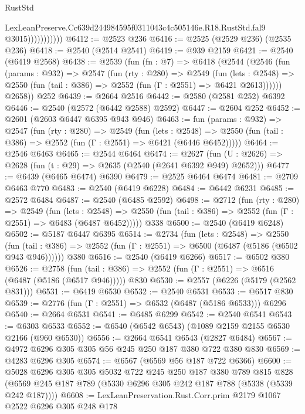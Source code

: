 \begin{lexlean}{RustStd}
\begin{coremodule}
                          LexLeanPreserve.Cc639d244984595f0311043c4c505146e.R18.RustStd.fal9
                          @3015)))))))))))
@6412 := @2523 @236
@6416 := @2525 (@2529 @236) (@2535 @236)
@6418 := @2540 (@2514 @2541)
@6419 := @939 @2159
@6421 := @2540 (@6419 @2568)
@6438 := @2539
    (fun (fn : @7) =>
    @6418
      (@2544
        (@2546
          (fun (params : @932) =>
          @2547
            (fun (rty : @280) =>
            @2549
              (fun (lets : @2548) =>
              @2550 (fun (tail : @386) => @2552 (fun (Γ : @2551) => @6421 @2613))))))
        @2658))
    @252
@6439 := @2664 @2516
@6442 := @2580 (@2581 @252) @6392
@6446 := @2540 (@2572 (@6442 @2588) @2592)
@6447 := @2604 @252
@6452 := @2601 (@2603 @6447 @6395 @943 @946)
@6463 := fun (params : @932) =>
  @2547
    (fun (rty : @280) =>
    @2549
      (fun (lets : @2548) =>
      @2550 (fun (tail : @386) => @2552 (fun (Γ : @2551) => @6421 (@6446 @6452)))))
@6464 := @2546 @6463
@6465 := @2544 @6464
@6474 := @2627 (fun (U : @2626) => @2628 (fun (t : @29) => @2635 (@2540 (@2641 @6392 @949) @2652)))
@6477 := @6439 (@6465 @6474) @6390
@6479 := @2525 @6464 @6474
@6481 := @2709 @6463 @770
@6483 := @2540 (@6419 @6228)
@6484 := @6442 @6231
@6485 := @2572 @6484
@6487 := @2540 (@6485 @2592)
@6498 := @2712
    (fun (rty : @280) =>
    @2549
      (fun (lets : @2548) =>
      @2550 (fun (tail : @386) => @2552 (fun (Γ : @2551) => @6483 (@6487 @6452)))))
    @338
@6500 := @2540 (@6419 @6248)
@6502 := @5187 @6447 @6395
@6514 := @2734
    (fun (lets : @2548) =>
    @2550 (fun (tail : @386) => @2552 (fun (Γ : @2551) => @6500 (@6487 (@5186 (@6502 @943 @946))))))
    @380
@6516 := @2540 (@6419 @6266)
@6517 := @6502 @380
@6526 := @2758
    (fun (tail : @386) => @2552 (fun (Γ : @2551) => @6516 (@6487 (@5186 (@6517 @946)))))
    @830
@6530 := @2557 (@6226 (@5179 (@2562 @831)))
@6531 := @6419 @6530
@6532 := @2540 @6531
@6533 := @6517 @830
@6539 := @2776 (fun (Γ : @2551) => @6532 (@6487 (@5186 @6533))) @6296
@6540 := @2664 @6531
@6541 := @6485 @6299
@6542 := @2540 @6541
@6543 := @6303 @6533
@6552 := @6540 (@6542 @6543) (@1089 @2159 @2155 @6530 @2166 (@960 @6530))
@6556 := @2664 @6541 @6543 (@2827 @6484)
@6567 := @4972 @6296 @305 @305 @56 @245 @250 @187 @380 @722 @380 @830
@6569 := @4283 @6296 @305
@6574 := @6567 (@6569 @56 @187 @722 @6366)
@6600 := @5028
    @6296
    @305
    @305
    @5032
    @722
    @245
    @250
    @187
    @380
    @789
    @815
    @828
    (@6569 @245 @187 @789 (@5330 @6296 @305 @242 @187 @788 (@5338 (@5339 @242 @187))))
@6608 := LexLeanPreservation.Rust.Corr.prim @2179 @1067 @2522 @6296 @305 @248 @178

\end{coremodule}
\end{lexlean}
